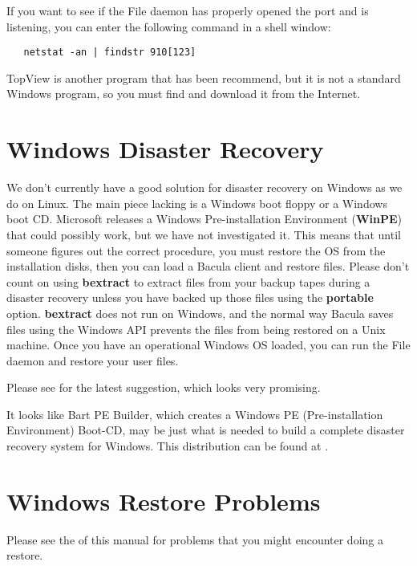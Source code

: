 If you want to see if the File daemon has properly opened the port and is
listening, you can enter the following command in a shell window: 

\footnotesize
\begin{verbatim}
   netstat -an | findstr 910[123]
\end{verbatim}
\normalsize

TopView is another program that has been recommend, but it is not a
standard Windows program, so you must find and download it from the Internet.

\section{Windows Disaster Recovery}

We don't currently have a good solution for disaster recovery on Windows as we
do on Linux. The main piece lacking is a Windows boot floppy or a Windows boot
CD. Microsoft releases a Windows Pre-installation Environment ({\bf WinPE})
that could possibly work, but we have not investigated it. This means that
until someone figures out the correct procedure, you must restore the OS from
the installation disks, then you can load a Bacula client and restore files.
Please don't count on using {\bf bextract} to extract files from your backup
tapes during a disaster recovery unless you have backed up those files using
the {\bf portable} option. {\bf bextract} does not run on Windows, and the
normal way Bacula saves files using the Windows API prevents the files from
being restored on a Unix machine. Once you have an operational Windows OS
loaded, you can run the File daemon and restore your user files. 

Please see 
 for the latest
suggestion, which looks very promising. 

It looks like Bart PE Builder, which creates a Windows PE (Pre-installation
Environment) Boot-CD, may be just what is needed to build a complete disaster
recovery system for Windows. This distribution can be found at 
.

\section{Windows Restore Problems}
Please see the  
 of this manual for problems
that you might encounter doing a restore.

